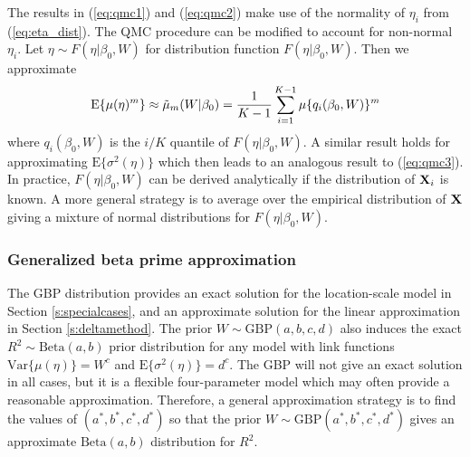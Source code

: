 \documentclass[12pt]{article}
\begin{document}
The results in (\ref{eq:qmc1}) and (\ref{eq:qmc2}) make use of the normality of $\eta_i$ from (\ref{eq:eta_dist}). The QMC procedure can be modified to account for non-normal $\eta_i$. Let $\eta\sim F(\eta|\beta_0,W)$ for distribution function $F(\eta|\beta_0,W)$. Then we approximate
$$
    \mbox{E}\{\mu(\eta)^m\}
    \approx {\tilde \mu}_m(W|\beta_0) = \frac1{K-1}\sum_{i=1}^{K-1} \mu\{q_i(\beta_0,W)\}^m
$$
where $q_i(\beta_0,W)$ is the $i/K$ quantile of $F(\eta|\beta_0,W)$. A similar result holds for approximating $\mbox{E}\{\sigma^2(\eta)\}$ which then leads to an analogous result to (\ref{eq:qmc3}). In practice, $F(\eta|\beta_0,W)$ can be derived analytically if the distribution of $\mbox{\bf X}_i$ is known. A more general strategy is to average over the empirical distribution of $\mbox{\bf X}$ giving a mixture of normal distributions for $F(\eta|\beta_0,W)$.

\subsubsection{Generalized beta prime approximation}\label{s:gbp}
The GBP distribution provides an exact solution for the location-scale model in Section \ref{s:specialcases}, and an approximate solution for the linear approximation in Section \ref{s:deltamethod}.  The prior $W\sim \mbox{GBP}(a,b,c,d)$ also induces the exact  $R^2\sim\mbox{Beta}(a,b)$ prior distribution for any model with link functions $  \mbox{Var}\{\mu(\eta)\}=W^c$ and $\mbox{E}\{\sigma^2(\eta)\}=d^c$. The GBP will not give an exact solution in all cases, but it is a flexible four-parameter model which may often provide a reasonable approximation. Therefore, a general approximation strategy is to find the values of $(a^*, b^*, c^*, d^*)$ so that the prior $W\sim \mbox{GBP}(a^*, b^*, c^*, d^*)$ gives an approximate $\mbox{Beta}(a,b)$ distribution for $R^2$.
\end{document}
